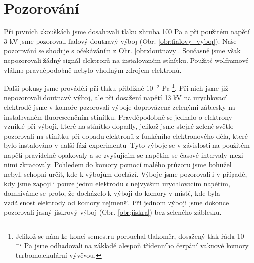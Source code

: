 \section{Pozorování}
\par Při prvních zkouškách jsme dosahovali tlaku zhruba 100 Pa a při použitém napětí 3 kV jsme pozorovali fialový doutnavý výboj (Obr. \ref{obr:fialovy_vyboj}). Naše pozorování se shoduje s očekáváním z Obr. \ref{obr:doutnavy}. Současně jsme však nepozorovali žádný signál elektronů na instalovaném stínítku. Použité wolframové vlákno pravděpodobně nebylo vhodným zdrojem elektronů. 
\par Další pokusy jsme prováděli při tlaku přibližně 10$^{-2}$ Pa \footnote{Jelikož se nám ke konci semestru porouchal tlakoměr, dosažený tlak řádu 10$^{-2}$ Pa jsme odhadovali na základě alespoň třídenního čerpání vakuové komory turbomolekulární vývěvou. }. Při nich jsme již nepozorovali doutnavý výboj, ale při dosažení napětí 13 kV na urychlovací elektrodě jsme v komoře pozorovali výboje doprovázené zelenými záblesky na instalovaném fluorescenčním stínítku. Pravděpodobně se jednalo o elektrony vzniklé při výboji, které na stínítko dopadly, jelikož jsme stejné zelené světlo pozorovali na stínítku při dopadu elektronů z funkčního elektronového děla, které bylo instalováno v další fázi experimentu. Tyto výboje se v závislosti na použitém napětí pravidelně opakovaly a se zvyšujícím se napětím se časové intervaly mezi nimi zkracovaly. Pohledem do komory pomocí malého průzoru jsme bohužel nebyli schopni určit, kde k výbojům dochází. Výboje jsme pozorovali i v případě, kdy jsme zapojili pouze jednu elektrodu s nejvyšším urychlovacím napětím, domníváme se proto, že docházelo k výboji do komory v místě, kde byla vzdálenost elektrody od komory nejmenší. Při jednom výboji jsme dokonce pozorovali jasný jiskrový výboj (Obr. \ref{obr:jiskra}) bez zeleného záblesku.

